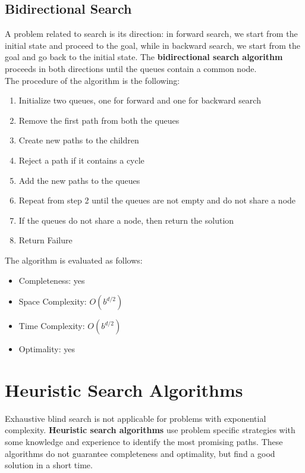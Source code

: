\documentclass{article}
\begin{document}
\subsection{Bidirectional Search}
A problem related to search is its direction: in forward search, we start from the initial state and proceed to the goal, while in backward search, we start from the goal and go back to the initial state. The \textbf{bidirectional search algorithm} proceeds in both directions until the queues contain a common node. \\
The procedure of the algorithm is the following:
\begin{enumerate}
    \item Initialize two queues, one for forward and one for backward search
    \item Remove the first path from both the queues
    \item Create new paths to the children
    \item Reject a path if it contains a cycle
    \item Add the new paths to the queues
    \item Repeat from step 2 until the queues are not empty and do not share a node
    \item If the queues do not share a node, then return the solution
    \item Return Failure
\end{enumerate}
The algorithm is evaluated as follows:
\begin{itemize}
    \item Completeness: yes
    \item Space Complexity: $O(b^{d/2})$
    \item Time Complexity: $O(b^{d/2})$
    \item Optimality: yes
\end{itemize}

\newpage

\section{Heuristic Search Algorithms}
Exhaustive blind search is not applicable for problems with exponential complexity. \textbf{Heuristic search algorithms} use problem specific strategies with some knowledge and experience to identify the most promising paths. These algorithms do not guarantee completeness and optimality, but find a good solution in a short time.
\end{document}
